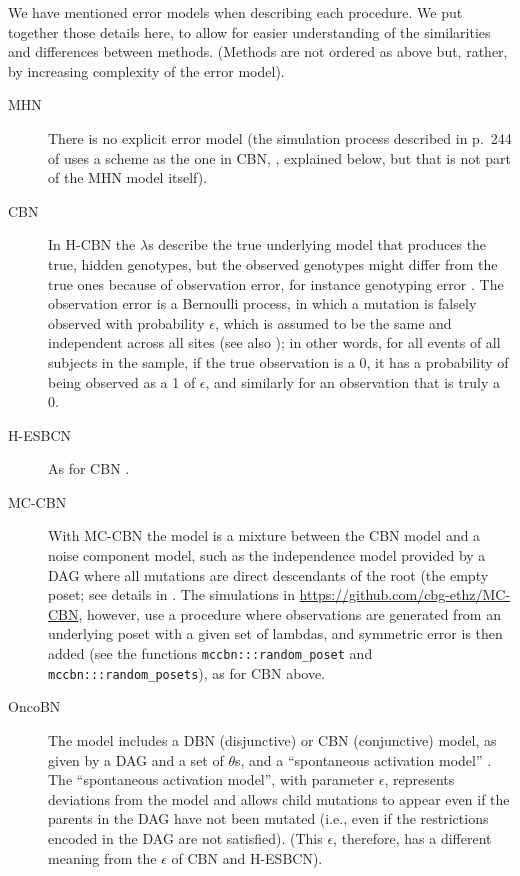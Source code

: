 \documentclass[a4paper,11pt]{article}
\begin{document}
We have mentioned error models when describing each procedure. We put together those details here, to allow for easier understanding of the similarities and differences between methods. (Methods are not ordered as above but, rather, by increasing complexity of the error model).

\begin{description}
  
\item[MHN] There is no explicit error model (the simulation process described in p.~244 of \citealp{schill2020modelling} uses a scheme as the one in CBN, \citealp{gerstung2009quantifying}, explained below, but that is not part of the MHN model itself).

\item[CBN] In H-CBN the $\lambda$s describe the true underlying model that produces the true, hidden genotypes, but the observed genotypes might differ from the true ones because of observation error, for instance genotyping error  \cite[p.~2810]{gerstung2009quantifying}.  The observation error is a Bernoulli process, in which a mutation is falsely observed with probability $\epsilon$,   which is assumed to be the same and independent across all sites (see also \citealp[p.~2319]{Sakoparnig2012}); in other words, for all events of all subjects in the sample, if the true observation is a 0, it has a probability of being observed as a 1 of $\epsilon$, and similarly for an observation that is truly a 0.

\item[H-ESBCN] As for CBN \cite[p.~756]{angaroni2021}.

\item[MC-CBN] With MC-CBN the model is a mixture between the CBN model and a noise component model, such as the independence model provided by a DAG where all mutations are direct descendants of the root (the empty poset; see details in \citealp[p.~i730-i731]{montazeri2016large}. The simulations in \url{https://github.com/cbg-ethz/MC-CBN}, however, use a procedure where observations are generated from an underlying poset with a given set of lambdas, and symmetric error is then added (see the functions \texttt{mccbn:::random\_poset} and \texttt{mccbn:::random\_posets}), as for CBN above.

  
\item[OncoBN] The model includes a DBN (disjunctive) or CBN (conjunctive) model, as given by a DAG and a set of $\theta$s, and a ``spontaneous activation model'' \cite[p.~3-4]{nicol2021oncogenetic}. The ``spontaneous activation model'', with parameter $\epsilon$, represents deviations from the model and allows child mutations to appear even if the parents in the DAG have not been mutated (i.e., even if the restrictions encoded in the DAG are not satisfied). (This $\epsilon$, therefore, has a different meaning from the $\epsilon$ of CBN and H-ESBCN).
   

\end{description}
\end{document}
